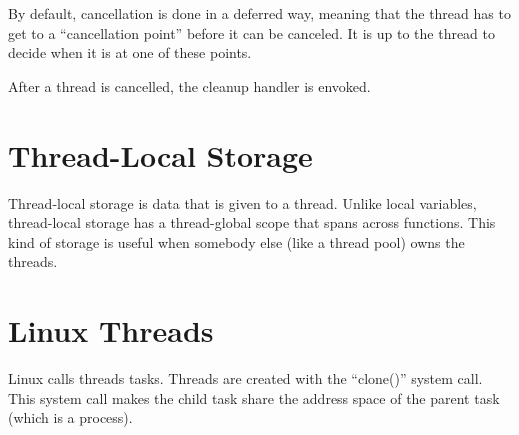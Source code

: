 \documentclass{article}
\begin{document}
By default, cancellation is done in a deferred way, meaning that the thread has
to get to a ``cancellation point'' before it can be canceled. It is up to the
thread to decide when it is at one of these points.

After a thread is cancelled, the cleanup handler is envoked.

\section{Thread-Local Storage}
Thread-local storage is data that is given to a thread. Unlike local variables,
thread-local storage has a thread-global scope that spans across functions.
This kind of storage is useful when somebody else (like a thread pool) owns the
threads.

\section{Linux Threads}
Linux calls threads tasks. Threads are created with the ``clone()'' system
call. This system call makes the child task share the address space of the
parent task (which is a process).
\end{document}
